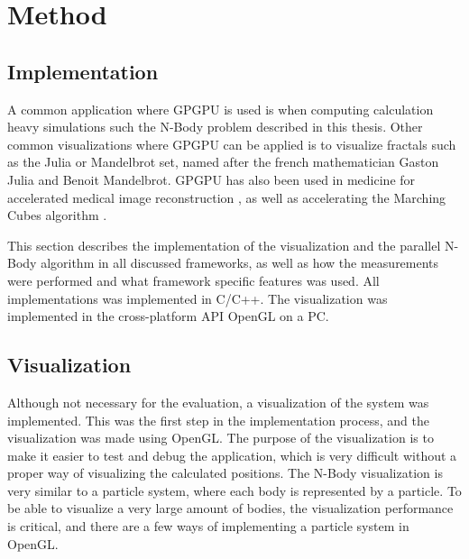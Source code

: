 
\chapter{Method}

\section{Implementation}
A common application where GPGPU is used is when computing calculation heavy simulations such the N-Body problem described in this thesis. Other common visualizations where GPGPU can be applied is to visualize fractals such as the Julia or Mandelbrot set, named after the french mathematician Gaston Julia and Benoit Mandelbrot. GPGPU has also been used in medicine for accelerated medical image reconstruction \cite{archirapatkave2011gpgpu}, as well as accelerating the Marching Cubes algorithm \cite{johansson2006accelerating}. 

This section describes the implementation of the visualization and the parallel N-Body algorithm in all discussed frameworks, as well as how the measurements were performed and what framework specific features was used. All implementations was implemented in C/C++. The visualization was implemented in the cross-platform API OpenGL on a PC.

\section{Visualization} \label{sec:visualization}

Although not necessary for the evaluation, a visualization of the system was implemented. This was the first step in the implementation process, and the visualization was made using OpenGL. The purpose of the visualization is to make it easier to test and debug the application, which is very difficult without a proper way of visualizing the calculated positions. The N-Body visualization is very similar to a particle system, where each body is represented by a particle. To be able to visualize a very large amount of bodies, the visualization performance is critical, and there are a few ways of implementing a particle system in OpenGL.

